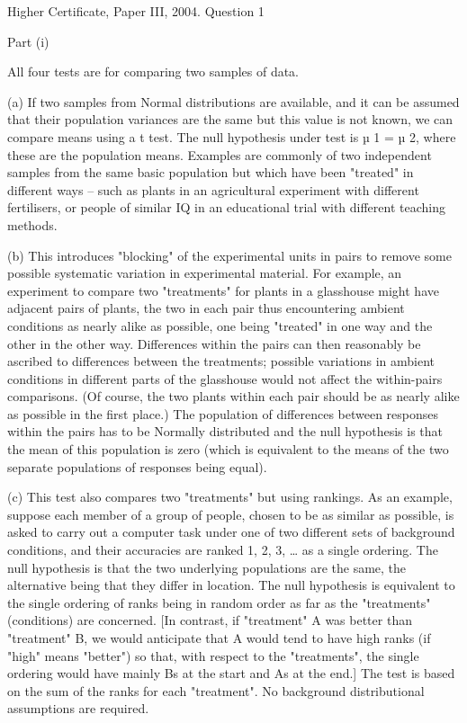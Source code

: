 \documentclass[a4paper,12pt]{article}
\begin{document}
Higher Certificate, Paper III, 2004.  Question 1 
 
 
Part (i) 
 
All four tests are for comparing two samples of data. 
 
(a) If two samples from Normal distributions are available, and it can be assumed that their population variances are the same but this value is not known, we can compare means using a t test.  The null hypothesis under test is µ 1 = µ 2, where these are the population means. 
 Examples are commonly of two independent samples from the same basic population but which have been "treated" in different ways  –  such as plants in an agricultural experiment with different fertilisers, or people of similar IQ in an educational trial with different teaching methods. 
 
(b) This introduces "blocking" of the experimental units in pairs to remove some possible systematic variation in experimental material. 
 For example, an experiment to compare two "treatments" for plants in a glasshouse might have adjacent pairs of plants, the two in each pair thus encountering ambient conditions as nearly alike as possible, one being "treated" in one way and the other in the other way.  Differences within the pairs can then reasonably be ascribed to differences between the treatments;  possible variations in ambient conditions in different parts of the glasshouse would not affect the within-pairs comparisons.  (Of course, the two plants within each pair should be as nearly alike as possible in the first place.)  The population of differences between responses within the pairs has to be Normally distributed and the null hypothesis is that the mean of this population is zero (which is equivalent to the means of the two separate populations of responses being equal). 
 
(c) This test also compares two "treatments" but using rankings. 
 As an example, suppose each member of a group of people, chosen to be as similar as possible, is asked to carry out a computer task under one of two different sets of background conditions, and their accuracies are ranked 1, 2, 3, … as a single ordering.  The null hypothesis is that the two underlying populations are the same, the alternative being that they differ in location.  The null hypothesis is equivalent to the single ordering of ranks being in random order as far as the "treatments" (conditions) are concerned.  [In contrast, if "treatment" A was better than "treatment" B, we would anticipate that A would tend to have high ranks (if "high" means "better") so that, with respect to the "treatments", the single ordering would have mainly Bs at the start and As at the end.]  The test is based on the sum of the ranks for each "treatment".  No background distributional assumptions are required. 
 
\end{document}
